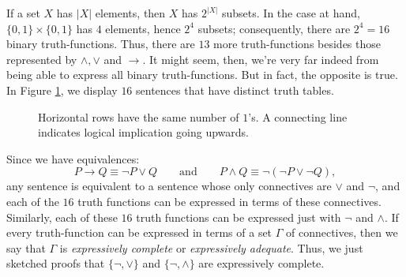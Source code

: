 If a set $X$ has $|X|$ elements, then $X$ has $2^{|X|}$ subsets.  In
the case at hand, $\{ 0,1\}\times \{ 0,1\}$ has $4$ elements, hence
$2^4$ subsets; consequently, there are $2^4=16$ binary
truth-functions.  Thus, there are $13$ more truth-functions besides
those represented by $\wedge ,\vee$ and $\to$.  It might seem, then,
we're very far indeed from being able to express all binary
truth-functions.  But in fact, the opposite is true.  In Figure
\ref{hasse}, we display $16$ sentences that have distinct truth tables.
\begin{figure}[htbp]
  \centering
\caption{Horizontal rows have the same number of $1$'s.  A connecting line indicates logical implication going upwards.} \label{hasse} 
\end{figure}

Since we have equivalences:
\[ P\to Q \equiv \neg P\vee Q \qquad \text{and} \qquad P\wedge Q
  \equiv \neg (\neg P\vee \neg Q) , \] any sentence is equivalent to a
sentence whose only connectives are $\vee$ and $\neg$, and each of the $16$ truth
functions can be expressed in terms of these connectives.  Similarly,
each of these $16$ truth functions can be expressed just with $\neg$
and $\wedge$.  If every truth-function
can be expressed in terms of a set $\Gamma$ of connectives, then we
say that $\Gamma$ is \emph{\gls{expressively complete}} or
\emph{expressively adequate}.  Thus, we just sketched proofs that
$\{ \neg ,\vee\}$ and $\{ \neg ,\wedge\}$ are expressively complete.

